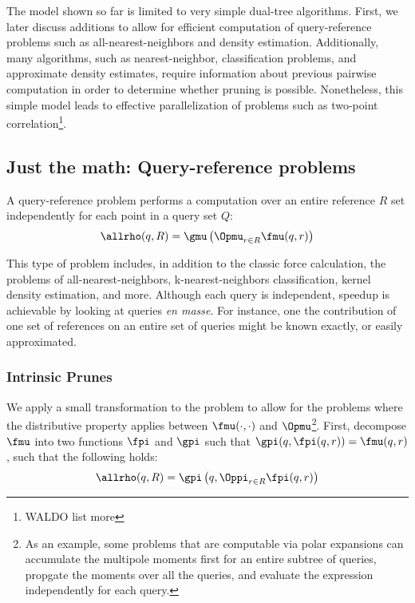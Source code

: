 \documentclass[times, 10pt,twocolumn]{article}
\begin{document}
The model shown so far is limited to very simple dual-tree algorithms.
First, we later discuss additions to allow for efficient computation of query-reference problems such as all-nearest-neighbors and density estimation.
Additionally, many algorithms, such as nearest-neighbor, classification problems, and approximate density estimates, require information about previous pairwise computation in order to determine whether pruning is possible.
Nonetheless, this simple model leads to effective parallelization of problems such as two-point correlation\footnote{WALDO list more}.

\subsection{Just the math: Query-reference problems}

A query-reference problem performs a computation over an entire reference $R$ set independently for each point in a query set $Q$:
\begin{equation}
\allrho(q, R) = \gmu \left( \Opmu_{r \in R} \fmu(q, r) \right)
\end{equation}

\noindent This type of problem includes, in addition to the classic \nbody force calculation, the problems of all-nearest-neighbors, k-nearest-neighbors classification, kernel density estimation, and more.
Although each query is independent, speedup is achievable by looking at queries {\it en masse}.
For instance, one the contribution of one set of references on an entire set of queries might be known exactly, or easily approximated.

\subsubsection{Intrinsic Prunes}

We apply a small transformation to the problem to allow for the problems where the distributive property applies between $\fmu(\cdot, \cdot)$ and $\Opmu$\footnote{As an example, some problems that are computable via polar expansions can accumulate the multipole moments first for an entire subtree of queries, propgate the moments over all the queries, and evaluate the expression independently for each query.}.
First, decompose $\fmu$ into two functions $\fpi$ and $\gpi$ such that $\gpi(q, \fpi(q, r)) = \fmu(q, r)$, such that the following holds:
\begin{equation}
\allrho(q, R) = \gpi \left(q, \Oppi_{r \in R} \fpi(q, r) \right)
\end{equation}
\end{document}
